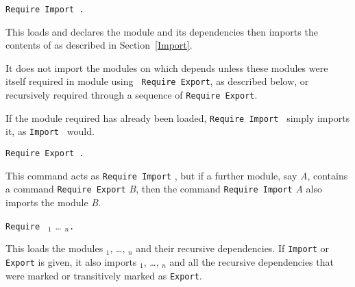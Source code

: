 \begin{Variants}
\item {\tt Require Import {\qualid}.}  

  This loads and declares the module {\qualid} and its dependencies
  then imports the contents of {\qualid} as described in
  Section~\ref{Import}.

  It does not import the modules on which {\qualid} depends unless
  these modules were itself required in module {\qualid} using {\tt
  Require Export}, as described below, or recursively required through
  a sequence of {\tt Require Export}.

  If the module required has already been loaded, {\tt Require Import
  {\qualid}} simply imports it, as {\tt Import {\qualid}} would.

\item {\tt Require Export {\qualid}.}

  This command acts as {\tt Require Import} {\qualid}, but if a
  further module, say {\it A}, contains a command {\tt Require
  Export} {\it B}, then the command {\tt Require Import} {\it A}
  also imports the module {\it B}.

\item {\tt Require } {\qualid}$_1$ {\ldots} {\qualid}$_n${\tt .}

  This loads the modules {\qualid}$_1$, \ldots, {\qualid}$_n$ and
  their recursive dependencies. If {\tt Import} or {\tt Export} is
  given, it also imports {\qualid}$_1$, \ldots, {\qualid}$_n$ and all
  the recursive dependencies that were marked or transitively marked
  as {\tt Export}.
\end{Variants}

